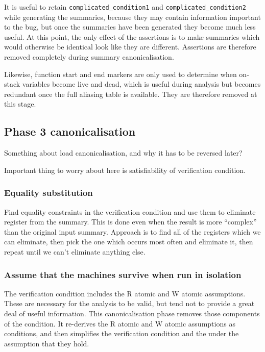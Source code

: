 It is useful to retain \verb|complicated_condition1| and \verb|complicated_condition2| while generating the summaries, because they may contain information important to the bug, but once the summaries have been generated they become much less useful.
At this point, the only effect of the assertions is to make summaries which would otherwise be identical look like they are different.
Assertions are therefore removed completely during summary canonicalisation.

Likewise, function start and end markers are only used to determine when on-stack variables become live and dead, which is useful during analysis but becomes redundant once the full aliasing table is available.
They are therefore removed at this stage.

\subsection{Phase 3 canonicalisation}

Something about load canonicalisation, and why it has to be reversed later?

Important thing to worry about here is satisfiability of verification condition.

\subsubsection{Equality substitution}
Find equality constraints in the verification condition and use them to eliminate register from the summary.
This is done even when the result is more ``complex'' than the original input summary.
Approach is to find all of the registers which we can eliminate, then pick the one which occurs most often and eliminate it, then repeat until we can't eliminate anything else.


\subsubsection{Assume that the machines survive when run in isolation}
The verification condition includes the R atomic and W atomic assumptions.
These are necessary for the analysis to be valid, but tend not to provide a great deal of useful information.
This canonicalisation phase removes those components of the condition.
It re-derives the R atomic and W atomic assumptions as conditions, and then simplifies the verification condition and the \StateMachines under the assumption that they hold.

